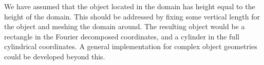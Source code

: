 We have assumed that the object located in the domain has height equal to the height of the domain.
This should be addressed by fixing some vertical length for the object and meshing the domain around.
The resulting object would be a rectangle in the Fourier decomposed coordinates, and a cylinder in the full cylindrical coordinates.
A general implementation for complex object geometries could be developed beyond this.